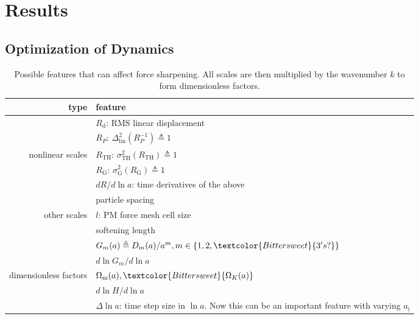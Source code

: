 \documentclass[modern, trackchanges, dvipsnames]{aastex631}
\renewcommand{\d}{d}
\newcommand{\lna}{\ln\!a}
\newcommand{\Omegam}{\Omega_\mathrm{m}}
\newcommand{\OmegaK}{\Omega_K}
\newcommand{\ic}{\mathrm{i}}
\newcommand{\linear}{\mathrm{lin}}
\newcommand{\tophat}{\mathrm{TH}}
\newcommand{\gauss}{\mathrm{G}}
\newcommand{\YL}[1]{\textcolor{Bittersweet}{#1}}
\begin{document}
\vspace{1em}
\section{Results}

\subsection{Optimization of Dynamics}

\begin{table}
  \centering
  \caption{Possible features that can affect force sharpening.
  All scales are then multiplied by the wavenumber $k$ to form dimensionless
  factors.}
  \label{tab:feat}
  \begin{tabular}{rl}
  \toprule
  type & feature \\
  \midrule
  & $R_\mathrm{d}$: RMS linear displacement \\
  \cmidrule(lr){2-2}
  & $R_P$: $\Delta_\linear^2(R_P^{-1}) \triangleq 1$ \\
  \cmidrule(lr){2-2}
  nonlinear scales & $R_\tophat$: $\sigma_\tophat^2(R_\tophat) \triangleq 1$ \\
  \cmidrule(lr){2-2}
  & $R_\gauss$: $\sigma_\gauss^2(R_\gauss) \triangleq 1$ \\
  \cmidrule(lr){2-2}
  & $\d R / \d\lna$: time derivatives of the above \\
  \midrule
  & particle spacing \\
  \cmidrule(lr){2-2}
  other scales & $l$: PM force mesh cell size \\
  \cmidrule(lr){2-2}
  & softening length \\
  \midrule
  & $G_m(a) \triangleq D_m(a) / a^m, m \in \{1, 2, \YL{3's?}\}$ \\
  \cmidrule(lr){2-2}
  & $\d\ln G_m / \d\lna$ \\
  \cmidrule(lr){2-2}
  dimensionless factors & $\Omegam(a), \YL{\OmegaK(a)}$ \\
  \cmidrule(lr){2-2}
  & $\d\ln\!H / \d\lna$ \\
  \cmidrule(lr){2-2}
  & $\Delta\lna$: time step size in $\lna$\YL{. Now this can be an important feature with varying $a_\ic$}\\
  \bottomrule
  \end{tabular}
  \end{table}
\end{document}
